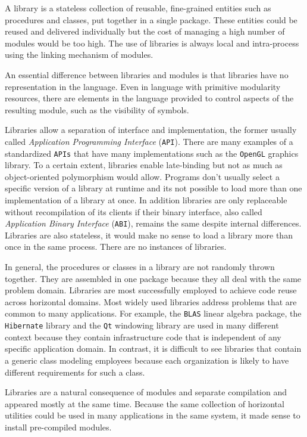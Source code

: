 A library is a stateless collection of reusable, fine-grained entities such as procedures and classes, put together in a single package. These entities could be reused
and delivered individually but the cost of managing a high number of modules would be too high. The use of libraries is always local and intra-process using the linking
mechanism of modules.

An essential difference between libraries and modules is that libraries have no representation in the language. Even in language with primitive modularity
resources, there are elements in the language provided to control aspects of the resulting module, such as the visibility of symbols.

Libraries allow a separation of interface and implementation, the former usually called \emph{Application Programming Interface} (\texttt{API}). There are many examples
of a standardized \texttt{APIs} that have many implementations such as the \texttt{OpenGL} graphics library. To a certain extent, libraries enable late-binding but not
as much as object-oriented polymorphism would allow. Programs don't usually select a specific version of a library at runtime and its not possible to load more than
one implementation of a library at once. In addition libraries are only replaceable without recompilation of its clients if their binary interface, also called
\emph{Application Binary Interface} (\texttt{ABI}), remains the same despite internal differences. Libraries are also stateless, it would make no sense to load a library
more than once in the same process. There are no instances of libraries.

In general, the procedures or classes in a library are not randomly thrown together. They are assembled in one package because they all deal with the same problem domain.
Libraries are most successfully employed to achieve code reuse across horizontal domains. Most widely used libraries address problems that are common to many applications.
For example, the \texttt{BLAS} linear algebra package, the \texttt{Hibernate} library and the \texttt{Qt} windowing library are used in many different context because they
contain infrastructure code that is independent of any specific application domain. In contrast, it is difficult to see libraries that contain a generic class modeling employees
because each organization is likely to have different requirements for such a class.

Libraries are a natural consequence of modules and separate compilation and appeared mostly at the same time. Because the same collection of horizontal utilities
could be used in many applications in the same system, it made sense to install pre-compiled modules.

